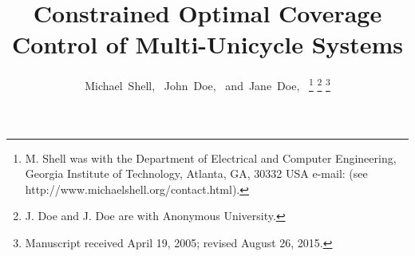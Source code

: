 \documentclass[journal]{IEEEtran}
\begin{document}
	\title{Constrained Optimal Coverage Control of Multi-Unicycle Systems}
	
	\author{Michael~Shell,~
		John~Doe,~
		and~Jane~Doe,~%
		\thanks{M. Shell was with the Department
			of Electrical and Computer Engineering, Georgia Institute of Technology, Atlanta,
			GA, 30332 USA e-mail: (see http://www.michaelshell.org/contact.html).}%
		\thanks{J. Doe and J. Doe are with Anonymous University.}%
		\thanks{Manuscript received April 19, 2005; revised August 26, 2015.}}
	
	
\end{document}
